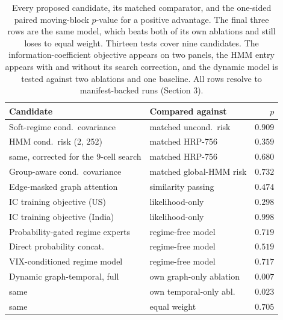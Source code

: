 \begin{table}[t]
\centering
\caption{Every proposed candidate, its matched comparator, and the one-sided
paired moving-block $p$-value for a positive advantage. The final three rows
are the same model, which beats both of its own ablations and still loses
to equal weight. Thirteen tests cover nine candidates. The
information-coefficient objective appears on two panels, the HMM entry appears with
and without its search correction, and the dynamic model is tested against two
ablations and one baseline. All rows resolve to manifest-backed runs (Section 3).}
\label{tab:ladder}
\footnotesize
\begin{tabular}{llr}
\toprule
Candidate & Compared against & $p$ \\
\midrule
Soft-regime cond.\ covariance & matched uncond.\ risk & $0.909$ \\
HMM cond.\ risk (2, 252) & matched HRP-756 & $0.359$ \\
\quad same, corrected for the 9-cell search & matched HRP-756 & $0.680$ \\
Group-aware cond.\ covariance & matched global-HMM risk & $0.732$ \\
Edge-masked graph attention & similarity passing & $0.474$ \\
IC training objective (US) & likelihood-only & $0.298$ \\
IC training objective (India) & likelihood-only & $0.998$ \\
Probability-gated regime experts & regime-free model & $0.719$ \\
Direct probability concat. & regime-free model & $0.519$ \\
VIX-conditioned regime model & regime-free model & $0.717$ \\
Dynamic graph-temporal, full & own graph-only ablation & $0.007$ \\
\quad same & own temporal-only abl. & $0.023$ \\
\quad same & equal weight & $0.705$ \\
\bottomrule
\end{tabular}
\end{table}
